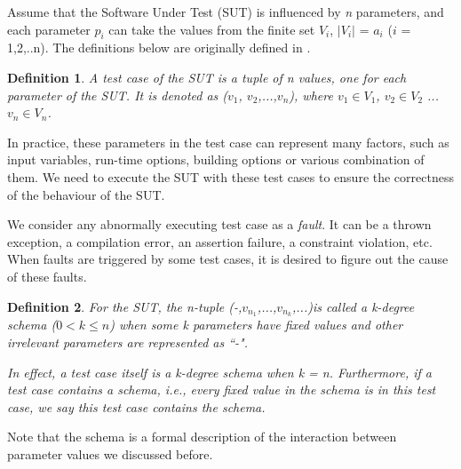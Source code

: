 \documentclass[journal,12pt,onecolumn,draftclsnofoot,]{IEEEtran}
\begin{document}

Assume that the Software Under Test (SUT) is influenced by \emph{n} parameters, and each parameter $p_{i}$ can take the values from the finite set $V_{i}$, $|V_{i}|$ = $a_{i}$ ($i$ = 1,2,..n). The definitions below are originally defined in \cite{nie2011minimal}.

\newtheorem{definition}{Definition}
\begin{definition}
A \emph{test case} of the SUT is a tuple of \emph{n} values, one for each parameter of the SUT. It is denoted as  ($v_{1}$, $v_{2}$,...,$v_{n}$), where $v_{1}\in V_{1}$, $v_{2} \in V_{2}$ ... $v_{n} \in V_{n}$.
\end{definition}

In practice, these parameters in the test case can represent many factors, such as input variables, run-time options, building options or various combination of them. We need to execute the SUT with these test cases to ensure the correctness of the behaviour of the SUT.

We consider any abnormally executing test case as a \emph{fault}. It can be a thrown exception, a compilation error, an assertion failure, a constraint violation, etc. When faults are triggered by some test cases, it is desired to figure out the cause of these faults.


\begin{definition}
For the SUT, the \emph{n}-tuple (-,$v_{n_{1}}$,...,$v_{n_{k}}$,...)is called a \emph{k}-degree \emph{schema} ($0 < k \leq n $) when some k parameters have fixed values and other irrelevant parameters are represented as ``-".

In effect, a test case itself is a k-degree \emph{schema} when k = n. Furthermore, if a test case contains a \emph{schema}, i.e., every fixed value in the schema is in this test case, we say this test case \emph{contains} the \emph{schema}.
\end{definition}
Note that the schema is a formal description of the interaction between parameter values we discussed before.
\end{document}
